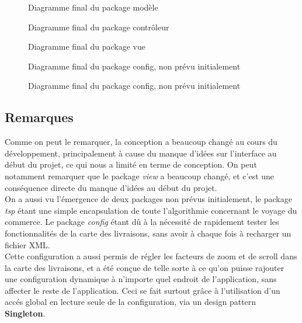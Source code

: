 \documentclass[a4paper]{report}
\newcommand{\adjustimg}{\ifodd\value{page}\hspace*{\dimexpr\evensidemargin-\oddsidemargin}\else\hspace*{-\dimexpr\evensidemargin-\oddsidemargin}\fi}
\newcommand{\centerimg}[2][width=\textwidth]{\makebox[\textwidth]{\adjustimg\texttt{[image: \#2]}}}
\begin{document}
\begin{figure}[H]
    \noindent\centerimg[width=\paperwidth, height=700pt]{images/modelFinal}
    \caption{Diagramme final du package modèle}
\end{figure}

\begin{figure}[H]
    \noindent\centerimg{images/controllerFinal}
    \caption{Diagramme final du package contrôleur}
\end{figure}

\begin{figure}[H]
    \noindent\centerimg{images/viewFinal}
    \caption{Diagramme final du package vue}
\end{figure}

\begin{figure}[H]
    \noindent\centerimg{images/tspFinal}
    \caption{Diagramme final du package config, non prévu initialement}
\end{figure}

\begin{figure}[H]
    \noindent\centerimg{images/configFinal}
    \caption{Diagramme final du package config, non prévu initialement}
\end{figure}

\subsection{Remarques}

Comme on peut le remarquer, la conception a beaucoup changé au cours du
développement, principalement à cause du manque d'idées sur l'interface au
début du projet, ce qui nous a limité en terme de conception. On peut notamment
remarquer que le package \emph{view} a beaucoup changé, et c'est une
conséquence directe du manque d'idées au début du projet. \\

On a aussi vu l'émergence de deux packages non prévus initialement, le package
\emph{tsp} étant une simple encapsulation de toute l'algorithmie concernant le
voyage du commerce. Le package \emph{config} étant dû à la nécessité de
rapidement tester les fonctionnalités de la carte des livraisons, sans avoir à
chaque fois à recharger un fichier XML. \\

Cette configuration a aussi permis de régler les facteurs de zoom et de scroll
dans la carte des livraisons, et a été conçue de telle sorte à ce qu'on puisse
rajouter une configuration dynamique à n'importe quel endroit de l'application,
sans affecter le reste de l'application. Ceci se fait surtout grâce à
l'utilisation d'un accés global en lecture seule de la configuration, via un
design pattern \textbf{Singleton}. \\
\end{document}
